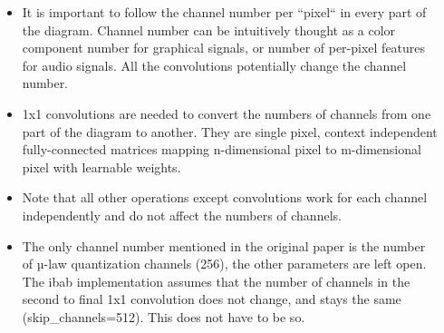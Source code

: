 \documentclass[8pt]{beamer}
\begin{document}
\begin{frame}[fragile]
\begin{columns}
\begin{column}{0.5\textwidth}
\end{column}
\begin{column}{0.5\textwidth}
{\tiny
\begin{itemize}
 \item It is important to follow the channel number per ``pixel`` in every part of the diagram. Channel number can be intuitively thought as a color component number for graphical
signals, or number of per-pixel features for audio signals. All the convolutions potentially change the channel number.
 \item 1x1 convolutions are needed to convert the numbers of channels from one part of the diagram to another. They are single pixel, context independent fully-connected matrices mapping
n-dimensional pixel to m-dimensional pixel with learnable weights.
 \item Note that all other operations except convolutions work for each channel independently and do not affect the numbers of channels.
 \item The only channel number mentioned in the original paper is the number of µ-law quantization channels (256), the other parameters are left open.
The ibab implementation assumes that the number of channels in the second to final 1x1 convolution does not change, and stays the same (skip\_channels=512). This does not have to be so.
\end{itemize}
}
\end{column}
\end{columns} 
 
\end{frame}
\end{document}
